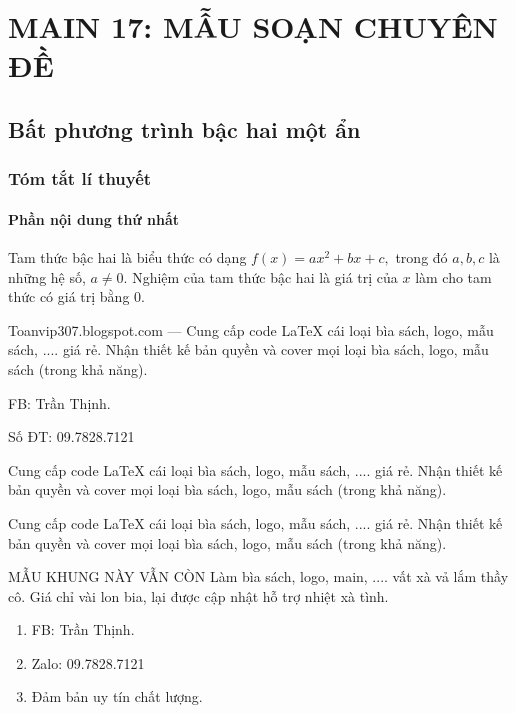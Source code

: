 \chapter{MAIN 17: MẪU SOẠN CHUYÊN ĐỀ}
\section{Bất phương trình bậc hai một ẩn}
\subsection{Tóm tắt lí thuyết}
\begin{tomtat}
\subsubsection{Phần nội dung thứ nhất}
	\begin{dn}
		Tam thức bậc hai là biểu thức có dạng $f(x)  =  ax^2  +  bx  +  c,$ trong đó $a,b,c$ là những hệ số, $a\ne 0$. Nghiệm của tam thức bậc hai là giá trị của $x$ làm cho tam thức có giá trị bằng $0$.
	\end{dn}	
	\begin{dl}
		Toanvip307.blogspot.com ---
		Cung cấp code \LaTeX{} cái loại bìa sách, logo, mẫu sách, .... giá rẻ. Nhận thiết kế bản quyền và cover mọi loại bìa sách, logo, mẫu sách (trong khả năng).
		\begin{listEX}[2]
			\item FB: Trần Thịnh.
			\item Số ĐT: 09.7828.7121
		\end{listEX}
	\end{dl}
\lipsum[1] %
\begin{note}
	Cung cấp code \LaTeX{} cái loại bìa sách, logo, mẫu sách, .... giá rẻ. Nhận thiết kế bản quyền và cover mọi loại bìa sách, logo, mẫu sách (trong khả năng).
\end{note}
\begin{hq}
	Cung cấp code \LaTeX{} cái loại bìa sách, logo, mẫu sách, .... giá rẻ. Nhận thiết kế bản quyền và cover mọi loại bìa sách, logo, mẫu sách (trong khả năng).
\end{hq}
\begin{noidung}{MẪU KHUNG NÀY VẪN CÒN}
	Làm bìa sách, logo, main, .... vất xà vả lắm thầy cô. Giá chỉ vài lon bia, lại được cập nhật hỗ trợ nhiệt xà tình.
	\begin{enumerate}[\itemKN]
	\item FB: Trần Thịnh.
	\item Zalo: 09.7828.7121
	\item Đảm bản uy tín chất lượng.
	\end{enumerate}
\end{noidung}

\end{tomtat}
